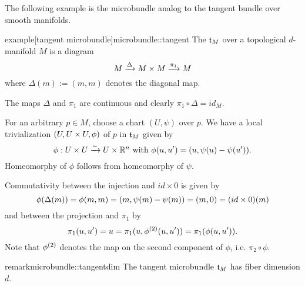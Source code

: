 \begin{myparagraph}
    The following example is the microbundle analog
    to the tangent bundle over smooth manifolds.
\end{myparagraph}

\begin{mystatement}{example}[tangent microbundle]{microbundle::tangent}
    The  $\mathfrak{t}_M$ over a topological $d$-manifold $M$ is a diagram
    \[ M \xrightarrow{\Delta} M \times M \xrightarrow{\pi_1} M{} \]
    where $\Delta(m) := (m, m)$ denotes the diagonal map.
\end{mystatement}

\begin{myproof}
    The maps $\Delta$ and $\pi_1$ are continuous and clearly $\pi_1 \circ \Delta = id_M$.

    For an arbitrary $p \in M$,
    choose a chart $(U, \psi)$ over $p$.
    We have a local trivialization $(U, U \times U, \phi)$ of $p$ in $\mathfrak{t}_M$ given by
    \[ \phi: U \times U \xrightarrow{\sim} U \times \mathbb{R}^n \text{ with } \phi(u, u') = (u, \psi(u) - \psi(u')). \]
    Homeomorphy of $\phi$ follows from homeomorphy of $\psi$.
    
    Commutativity between the injection and $id \times 0$ is given by
    \[ \phi(\Delta(m)) = \phi(m, m) = (m, \psi(m) - \psi(m)) = (m, 0) = (id \times 0)(m)\]
    and between the projection and $\pi_1$ by
    \[ \pi_1(u, u') = u = \pi_1(u, \phi^{(2)}(u, u')) = \pi_1(\phi(u, u')). \]
    Note that $\phi^{(2)}$ denotes the map on
    the second component of $\phi$, i.e. $\pi_2 \circ \phi$.
\end{myproof}

\begin{mystatement}{remark}{microbundle::tangentdim}
    The tangent microbundle $\mathfrak{t}_M$ has fiber dimension $d$.
\end{mystatement}

